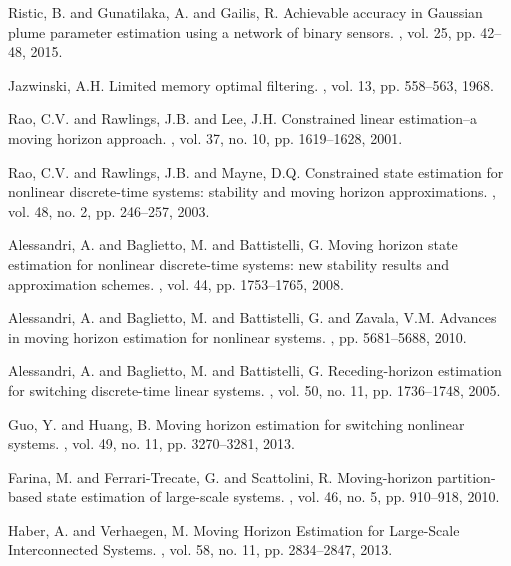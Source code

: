 \documentclass[11pt,journal,onecolumn]{IEEEtran}
\begin{document}
\begin{thebibliography}{10}
Ristic, B. and Gunatilaka, A. and Gailis, R.
\newblock Achievable accuracy in Gaussian plume parameter estimation using a network of binary sensors.
, vol. 25, pp. 42--48, 2015.

Jazwinski, A.H.
\newblock Limited memory optimal filtering.
,  vol. 13, pp. 558--563, 1968.

Rao, C.V. and Rawlings, J.B. and Lee, J.H.
\newblock Constrained linear estimation--a moving horizon approach.
,  vol. 37, no. 10, pp. 1619--1628, 2001.

Rao, C.V. and Rawlings, J.B. and Mayne, D.Q.
\newblock Constrained state estimation for nonlinear discrete-time systems: stability and moving horizon approximations.
, vol. 48, no. 2, pp. 246--257, 2003.

Alessandri, A. and Baglietto, M. and Battistelli, G.
\newblock Moving horizon state estimation for nonlinear discrete-time systems: new stability results and approximation schemes.
, vol. 44, pp. 1753--1765, 2008.

Alessandri, A. and Baglietto, M. and Battistelli, G. and Zavala, V.M.
\newblock Advances in moving horizon estimation for nonlinear systems.
, pp. 5681--5688, 2010.

Alessandri, A. and Baglietto, M. and Battistelli, G.
\newblock Receding-horizon estimation for switching discrete-time linear systems.
, vol. 50, no. 11, pp. 1736--1748, 2005.

Guo, Y. and Huang, B.
\newblock Moving horizon estimation for switching nonlinear systems.
, vol. 49, no. 11, pp. 3270--3281, 2013.

Farina, M. and {Ferrari-Trecate}, G. and Scattolini, R.
\newblock Moving-horizon partition-based state estimation of large-scale systems.
, vol. 46, no. 5, pp. 910--918, 2010.

Haber, A. and Verhaegen, M.
\newblock Moving Horizon Estimation for Large-Scale Interconnected Systems.
, vol. 58, no. 11, pp. 2834--2847, 2013.


\end{thebibliography}
\end{document}
